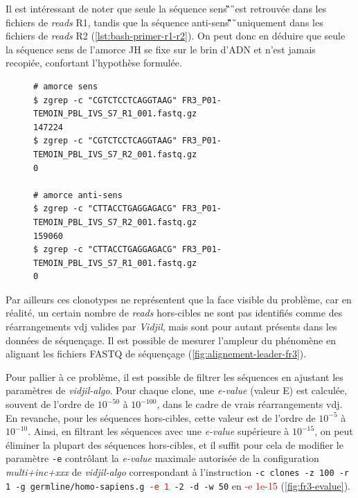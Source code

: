 Il est intéressant de noter que seule la séquence sens \C\G\T\C\T\C\C\T\C\A\G\G\T\A\A\G\ est retrouvée dans les fichiers de \textit{reads} 
R1, tandis que la séquence anti-sens \C\T\T\A\C\C\T\G\A\G\G\A\G\A\C\G\ uniquement dans les fichiers de \textit{reads} 
R2 (\autoref{lst:bash-primer-r1-r2}). On peut donc en déduire que seule la séquence sens de l'amorce JH se fixe sur 
le brin d'ADN et n'est jamais recopiée, confortant l'hypothèse formulée.

\begin{figure}[H]
\begin{lstlisting}[language=custombash, 
    caption={Commande Bash et résultat de la recherche des séquences des amorces dans les fichiers FASTQ R1 et R2.},
    label={lst:bash-primer-r1-r2},
basicstyle=\ttfamily\small]
# amorce sens
$ zgrep -c "CGTCTCCTCAGGTAAG" FR3_P01-TEMOIN_PBL_IVS_S7_R1_001.fastq.gz
147224
$ zgrep -c "CGTCTCCTCAGGTAAG" FR3_P01-TEMOIN_PBL_IVS_S7_R2_001.fastq.gz
0

# amorce anti-sens
$ zgrep -c "CTTACCTGAGGAGACG" FR3_P01-TEMOIN_PBL_IVS_S7_R2_001.fastq.gz
159060
$ zgrep -c "CTTACCTGAGGAGACG" FR3_P01-TEMOIN_PBL_IVS_S7_R1_001.fastq.gz
0
\end{lstlisting}
\end{figure}
    
Par ailleurs ces clonotypes ne représentent que la face visible du problème, car en réalité, un certain nombre de \textit{reads} 
hors-cibles ne sont pas identifiés comme des réarrangements \gls{vdj} valides par \textit{Vidjil}, mais sont pour autant présents 
dans les données de séquençage. Il est possible de mesurer l'ampleur du phénomène en alignant les fichiers FASTQ de séquençage 
(\autoref{fig:alignement-leader-fr3}).



Pour pallier à ce problème, il est possible de filtrer les séquences en ajustant les paramètres de \textit{vidjil-algo}.
Pour chaque clone, une \textit{e-value} (valeur E) est calculée, souvent de l'ordre de $10^{-50}$ à $10^{-100}$, dans le 
cadre de vrais réarrangements \gls{vdj}. En revanche, pour les séquences hors-cibles, cette valeur est de l'ordre de $10^{-5}$ à $10^{-10}$. 
Ainsi, en filtrant les séquences avec une \textit{e-value} supérieure à $10^{-15}$, on peut éliminer la plupart des séquences hors-cibles, et 
il suffit pour cela de modifier le paramètre \texttt{-e} contrôlant la \textit{e-value} maximale autorisée de la configuration \textit{multi+inc+xxx} 
de \textit{vidjil-algo} correspondant à l'instruction \texttt{-c clones -z 100 -r 1 -g germline/homo-sapiens.g \textcolor{red}{-e 1} -2 -d -w 50} 
en \textcolor{red}{-e 1e-15} (\autoref{fig:fr3-evalue}).

